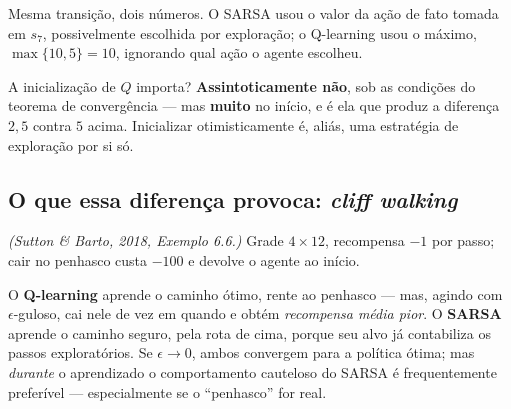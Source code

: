 \documentclass[11pt]{article}
\begin{document}
Mesma transição, dois números. O SARSA usou o valor da ação de fato tomada em
$s_7$, possivelmente escolhida por exploração; o Q-learning usou o máximo,
$\max\{10,5\} = 10$, ignorando qual ação o agente escolheu.

\begin{alertabox}
  A inicialização de $Q$ importa? \textbf{Assintoticamente não}, sob as
  condições do teorema de convergência --- mas \textbf{muito} no início, e é ela
  que produz a diferença $2{,}5$ contra $5$ acima. Inicializar otimisticamente
  é, aliás, uma estratégia de exploração por si só.
\end{alertabox}

\subsection{O que essa diferença provoca: \emph{cliff walking}}\label{sec:cliff}

\textit{(Sutton \& Barto, 2018, Exemplo 6.6.)} Grade $4 \times 12$, recompensa
$-1$ por passo; cair no penhasco custa $-100$ e devolve o agente ao início.

\begin{center}
\end{center}

O \textbf{Q-learning} aprende o caminho ótimo, rente ao penhasco --- mas,
agindo com $\epsilon$-guloso, cai nele de vez em quando e obtém
\emph{recompensa média pior}. O \textbf{SARSA} aprende o caminho seguro, pela
rota de cima, porque seu alvo já contabiliza os passos exploratórios. Se
$\epsilon \to 0$, ambos convergem para a política ótima; mas \emph{durante} o
aprendizado o comportamento cauteloso do SARSA é frequentemente preferível ---
especialmente se o ``penhasco'' for real.
\end{document}
